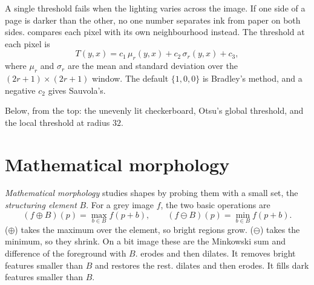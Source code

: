 A single threshold fails when the lighting varies across the image. If one side
of a page is darker than the other, no one number separates ink from paper on both
sides. \mcode{[img, r, \{c1, c2, c3\}]} compares each pixel
with its own neighbourhood instead. The threshold at each pixel is
\[
  T(y, x) = c_1\, \mu_r(y, x) + c_2\, \sigma_r(y, x) + c_3 ,
\]
where \(\mu_r\) and \(\sigma_r\) are the mean and standard deviation over the
\((2r+1)\times(2r+1)\) window. The default \(\{1, 0, 0\}\) is Bradley's method,
and a negative \(c_2\) gives Sauvola's.

\begin{codepairs}
\end{codepairs}

Below, from the top: the unevenly lit checkerboard, Otsu's global threshold, and
the local threshold at radius \(32\).




\section{Mathematical morphology}
\label{sec:img-morphology}

\emph{Mathematical morphology} studies shapes by
probing them with a small set, the \emph{structuring element} \(B\). For a grey
image \(f\), the two basic operations are
\[
  (f \oplus B)(p) = \max_{b \in B} f(p + b), \qquad
  (f \ominus B)(p) = \min_{b \in B} f(p + b).
\]
 (\(\oplus\)) takes the maximum over the element, so bright regions
grow.  (\(\ominus\)) takes the minimum, so they shrink. On a bit
image these are the Minkowski sum and difference of the foreground with \(B\).
 erodes and then dilates. It removes bright features smaller than
\(B\) and restores the rest.  dilates and then erodes. It fills dark
features smaller than \(B\).


